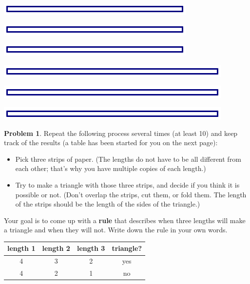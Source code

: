 \documentclass[12pt, reqno]{amsart}
\theoremstyle{remark}
\theoremstyle{definition}
\newtheorem{problem}{Problem}
\numberwithin{equation}{section}  %
\begin{document}
\begin{center}
\includegraphics{5in}
 
 \includegraphics{5in}

\includegraphics{5in}

\bigskip

\includegraphics{6in}
 
 \includegraphics{6in}

\includegraphics{6in}
\end{center}

\newpage

\begin{problem}
Repeat the following process several times (at least 10) and keep track of the results (a table has been started for you on the next page):
\begin{itemize}
\item
Pick three  strips of paper.  (The lengths do not have to be all different from each other; that's why you have multiple copies of each length.)\\
\item
Try to make a triangle with those three strips, and decide if you think it is possible or not.  (Don't overlap the strips, cut them, or fold them.  The length of the strips should be the length of the sides of the triangle.)
\end{itemize}
Your goal is to come up with a {\bf rule} that describes when three lengths will make a triangle and when they will not. Write down the rule in your own words.
\end{problem}


\bigskip
\begin{center}
\begin{tabular}{|c c c c|}\hline
length 1 & length 2 & length 3 & triangle? \\ \hline\hline
4 & 3 & 2 & yes \\ \hline
4 & 2 & 1 & no \\ \hline
\end{tabular}
\end{center}
\end{document}
